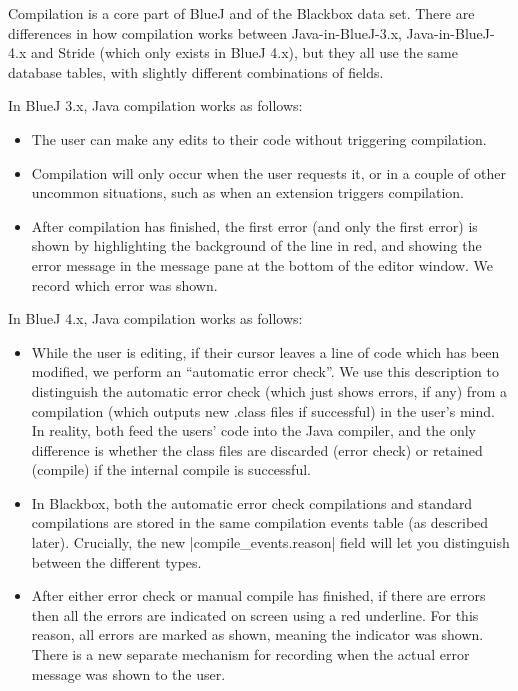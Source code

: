 \documentclass{report}
\begin{document}
Compilation is a core part of BlueJ and of the Blackbox data set.  There are differences in how
compilation works between Java-in-BlueJ-3.x, Java-in-BlueJ-4.x and Stride (which only exists in BlueJ 4.x),
but they all use the same database tables, with slightly different combinations of fields.

In BlueJ 3.x, Java compilation works as follows:

\begin{itemize}
\item The user can make any edits to their code without triggering compilation.
\item Compilation will only occur when the user requests it, or in a couple of other
uncommon situations, such as when an extension triggers compilation.
\item After compilation has finished, the first error (and only the first error) is
shown by highlighting the background of the line in red, and showing the error message
in the message pane at the bottom of the editor window.  We record which error was shown.
\end{itemize}

In BlueJ 4.x, Java compilation works as follows:
\begin{itemize}
\item While the user is editing, if their cursor leaves a line of code which has been
modified, we perform an ``automatic error check''.  We use this description to
distinguish the automatic error check (which just shows
errors, if any) from a compilation (which outputs new .class files if successful) in
the user's mind.  In reality, both feed the users' code into the Java compiler, and the
only difference is whether the class files are discarded (error check) or retained (compile)
if the internal compile is successful.
\item In Blackbox, both the automatic error check compilations and standard compilations
 are stored in the same compilation events table (as described later).
 Crucially, the new |compile_events.reason| field will let you distinguish between
 the different types.
\item After either error check or manual compile has finished, if there are errors then
all the errors are indicated on screen using a red underline.  For this reason, all
errors are marked as shown, meaning the indicator was shown.  There is a new separate
mechanism for recording when the actual error message was shown to the user.
\end{itemize}
\end{document}
